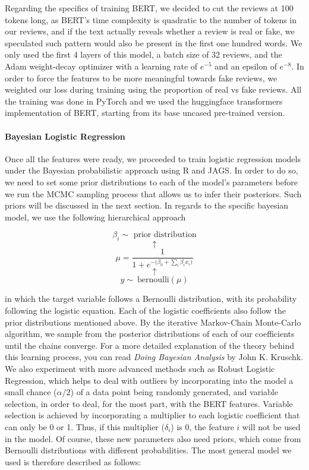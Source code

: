\documentclass[man, floatsintext, 10pt]{apa6}
\begin{document}
Regarding the specifics of training BERT, we decided to cut the reviews at 100 tokens long, as BERT's time complexity is quadratic to the number of tokens in our reviews, and if the text actually reveals whether a review is real or fake, we speculated such pattern would also be present in the first one hundred words. We only used the first 4 layers of this model, a batch size of 32 reviews, and the Adam weight-decay optimizer with a learning rate of $e^{-5}$ and an epsilon of $e^{-8}$. In order to force the features to be more meaningful towards fake reviews, we weighted our loss during training using the proportion of real vs fake reviews. All the training was done in PyTorch and we used the huggingface transformers implementation of BERT, starting from its base uncased pre-trained version.

\vspace{2mm}

\paragraph{Bayesian Logistic Regression} Once all the features were ready, we proceeded to train logistic regression models under the Bayesian probabilistic approach using R and JAGS. In order to do so, we need to set some prior distributions to each of the model's parameters before we run the MCMC sampling process that allows us to infer their posteriors. Such priors will be discussed in the next section. In regards to the specific bayesian model, we use the following hierarchical approach 

\[\beta_i \sim \text{ prior distribution} \] \[ \uparrow \] \[ \mu = \frac{1}{1 + e^{-\big(\beta_0 + \sum_i \beta_i x_i \big)}} \] \vspace{0.01mm}  \[ \uparrow \] \[ y \sim\ \text{bernoulli} (\mu) \]

in which the target variable follows a Bernoulli distribution, with its probability following the logistic equation. Each of the logistic coefficients also follow the prior distributions mentioned above. By the iterative Markov-Chain Monte-Carlo algorithm, we sample from the posterior distributions of each of our coefficients until the chains converge. For a more detailed explanation of the theory behind this learning process, you can read \textit{Doing Bayesian Analysis} by John K. Kruschk. We also experiment with more advanced methods such as Robust Logistic Regression, which helps to deal with outliers by incorporating into the model a small chance ($\alpha/2$) of a data point being randomly generated, and variable selection, in order to deal, for the most part, with the BERT features. Variable selection is achieved by incorporating a multiplier to each logistic coefficient that can only be 0 or 1. Thus, if this multiplier ($\delta_i$) is 0, the feature $i$ will not be used in the model. Of course, these new parameters also need priors, which come from Bernoulli distributions with different probabilities. The most general model we used is therefore described as follows:
\end{document}
